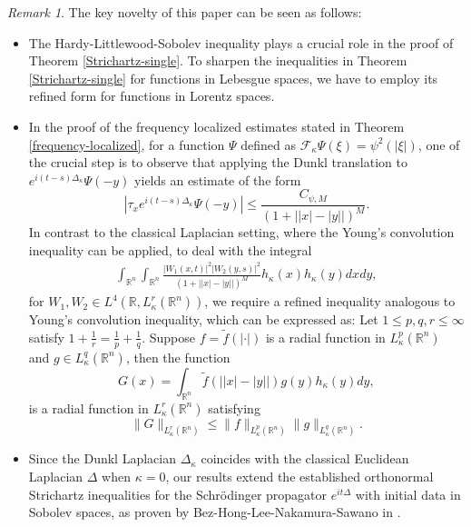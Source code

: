 \documentclass[a4paper,11pt, reqno]{amsart}
\numberwithin{equation}{section}
\theoremstyle{plain}
\theoremstyle{definition}
\theoremstyle{remark}
\newtheorem{remark}[theorem]{Remark}
\begin{document}
\begin{remark} The key novelty of this paper can be seen as follows:
	\begin{itemize}
		\item 
		The Hardy-Littlewood-Sobolev inequality plays a crucial role in the proof of Theorem  \ref{Strichartz-single}. To sharpen the inequalities in Theorem \ref{Strichartz-single} for functions in Lebesgue spaces, we have to employ its refined form for functions in Lorentz spaces.
		\item 	
 In the proof of  the frequency localized estimates stated in 
 Theorem \ref{frequency-localized}, for a function $\Psi$ defined as  $\mathcal{F}_\kappa \Psi(\xi)=\psi^2(|\xi|)$, one of the crucial step is to observe that applying the Dunkl translation to  $e^{i(t-s)\Delta_\kappa} \Psi(-y)$ yields an estimate of the form
		\begin{equation*}
			\left|\tau_xe^{i(t-s)\Delta_\kappa} \Psi(-y)\right|\leq \frac{C_{\psi,M}}{\left(1+\big||x|-|y|\big|\right)^M}.
		\end{equation*}
  In contrast to the classical Laplacian setting, where the Young's convolution inequality can be applied, to deal with the integral 
		\begin{align*}	\int_{\mathbb{R}^{n}}\int_{\mathbb{R}^{n}}\frac{|W_1(x,t)|^2|W_2(y,s)|^2 }{\left(1+\big||x|-|y|\big|\right)^{M}}h_\kappa(x)h_\kappa(y)dxdy, 
		\end{align*}
		for  $W_1, W_2\in  L^{4}(\mathbb{R}, L_\kappa^{r}(\mathbb{R}^n))$, 
		we require a refined inequality analogous to Young's convolution inequality, which can be expressed as:
		Let $1\leq p,q,r\leq \infty$ satisfy $1+\frac{1}{r}=\frac{1}{p}+\frac{1}{q}$. Suppose $f=\tilde{f}(|\cdot|)$ is a radial function in $L_\kappa^p(\mathbb{R}^n)$ and $g\in L_\kappa^q(\mathbb{R}^n)$, then the function
		\begin{equation*}
			G(x)=\int_{\mathbb{R}^n}\tilde{f}\left(\big||x|-|y|\big|\right)g(y)h_\kappa(y) dy,
		\end{equation*}
		is a radial function in $L_\kappa^r(\mathbb{R}^n)$ satisfying
		\begin{equation*}
			\|G\|_{L_\kappa^r(\mathbb{R}^n)}\leq \|f\|_{L_\kappa^p(\mathbb{R}^n)} \|g\|_{L_\kappa^q(\mathbb{R}^n)}.  
		\end{equation*}
		
		
 
		\item 		Since the Dunkl Laplacian $\Delta_\kappa$ coincides with the classical Euclidean Laplacian $\Delta$ when $\kappa = 0$, our results extend the established orthonormal Strichartz inequalities for the Schrödinger propagator $e^{it\Delta}$ with initial data in Sobolev spaces, as proven by Bez-Hong-Lee-Nakamura-Sawano  in \cite{Bez-Hong-Lee-Nakamura-Sawano}.
     
	\end{itemize}
	
	\end{remark}
\end{document}
